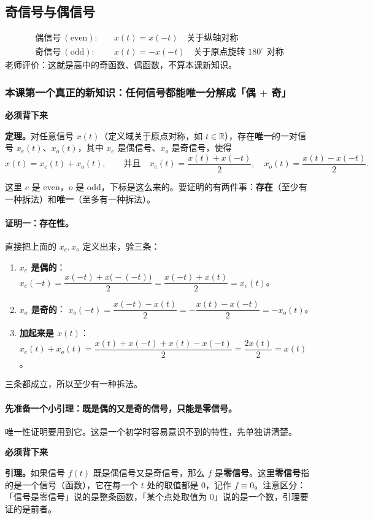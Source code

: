\documentclass[UTF8,a4paper,11pt]{ctexart}
\newenvironment{remember}{\begin{rememberbox}\textbf{必须背下来}\par\smallskip}{\end{rememberbox}}
\begin{document}
\subsection{奇信号与偶信号}
\begin{align*}
\text{偶信号}\ (\text{even}):&\quad x(t)=x(-t)\quad \text{关于纵轴对称}\\
\text{奇信号}\ (\text{odd}):&\quad x(t)=-x(-t)\quad \text{关于原点旋转 }180^\circ\text{ 对称}
\end{align*}
老师评价：这就是高中的奇函数、偶函数，不算本课新知识。

\subsubsection*{本课第一个真正的新知识：任何信号都能唯一分解成「偶 $+$ 奇」}
\begin{remember}
\textbf{定理。}对任意信号 $x(t)$（定义域关于原点对称，如 $t\in\mathbb{R}$），存在\textbf{唯一}的一对信号 $x_e(t)$、$x_o(t)$，其中 $x_e$ 是偶信号、$x_o$ 是奇信号，使得
\[
x(t)=x_e(t)+x_o(t),\qquad\text{并且}\quad
x_e(t)=\frac{x(t)+x(-t)}{2},\quad x_o(t)=\frac{x(t)-x(-t)}{2}.
\]
\end{remember}
这里 $e$ 是 even，$o$ 是 odd，下标是这么来的。要证明的有两件事：\textbf{存在}（至少有一种拆法）和\textbf{唯一}（至多有一种拆法）。

\paragraph{证明一：存在性。}直接把上面的 $x_e,x_o$ 定义出来，验三条：
\begin{enumerate}[nosep]
\item \textbf{$x_e$ 是偶的}：
$x_e(-t)=\dfrac{x(-t)+x\bigl(-(-t)\bigr)}{2}=\dfrac{x(-t)+x(t)}{2}=x_e(t)$。
\item \textbf{$x_o$ 是奇的}：
$x_o(-t)=\dfrac{x(-t)-x(t)}{2}=-\dfrac{x(t)-x(-t)}{2}=-x_o(t)$。
\item \textbf{加起来是 $x(t)$}：
$x_e(t)+x_o(t)=\dfrac{x(t)+x(-t)+x(t)-x(-t)}{2}=\dfrac{2x(t)}{2}=x(t)$。
\end{enumerate}
三条都成立，所以至少有一种拆法。

\paragraph{先准备一个小引理：既是偶的又是奇的信号，只能是零信号。}
唯一性证明要用到它。这是一个初学时容易意识不到的特性，先单独讲清楚。

\begin{remember}
\textbf{引理。}如果信号 $f(t)$ 既是偶信号又是奇信号，那么 $f$ 是\textbf{零信号}。这里\textbf{零信号}指的是一个信号（函数），它在每一个 $t$ 处的取值都是 $0$，记作 $f\equiv0$。注意区分：「信号是零信号」说的是整条函数，「某个点处取值为 $0$」说的是一个数，引理要证的是前者。
\end{remember}
\end{document}

